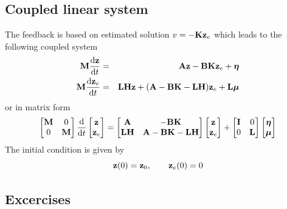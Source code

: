 \documentclass[12pt]{article}
\begin{document}
\subsection{Coupled linear system}
The feedback is based on estimated solution $v = -\K \z_e$ which leads to the following coupled system
\begin{eqnarray*}
\M \dd{\z}{t} &=& \A \z - \B \K \z_e + \boldsymbol\eta \\
\M \dd{\z_e}{t} &=& \bL \bH \z + (\A - \B \K - \bL \bH) \z_e + \bL \boldsymbol\mu
\end{eqnarray*}
or in matrix form
\[\begin{bmatrix}
   \M & 0\\
   0 & \M \\
  \end{bmatrix}
\dd{}{t} \begin{bmatrix}
\z \\
\z_e \end{bmatrix} = \begin{bmatrix}
\A & -\B \K \\
\bL \bH & \A - \B \K - \bL \bH \end{bmatrix} \begin{bmatrix}
\z \\ \z_e \end{bmatrix} + \begin{bmatrix}
\I & 0 \\
0 & \bL \end{bmatrix} \begin{bmatrix}
\boldsymbol\eta \\ \boldsymbol\mu \end{bmatrix}
\]
The initial condition is given by
\[
\z(0) = \z_0, \qquad \z_e(0) = 0
\]

\subsection{Excercises}
\end{document}

